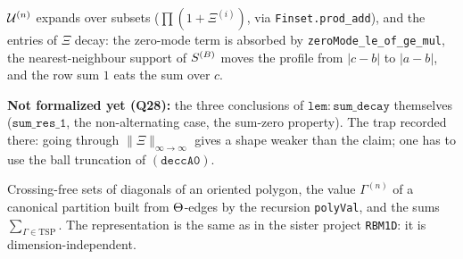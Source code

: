 \begin{lemma}\label{lem:sumdecay-parts}
  \leanok
  $\mathcal{U}^{(n)}$ expands over subsets ($\prod(1+\Xi^{(i)})$, via \texttt{Finset.prod\_add}), and
  the entries of $\Xi$ decay: the zero-mode term is absorbed by
  \texttt{zeroMode\_le\_of\_ge\_mul}, the nearest-neighbour support of $S^{(B)}$ moves the profile
  from $|c-b|$ to $|a-b|$, and the row sum $1$ eats the sum over $c$.

  \textbf{Not formalized yet (Q28):} the three conclusions of $\mathtt{lem{:}sum\_decay}$
  themselves ($\mathtt{sum\_res\_1}$, the non-alternating case, the sum-zero property).
  The trap recorded there: going through $\|\Xi\|_{\infty\to\infty}$ gives a shape weaker
  than the claim; one has to use the ball truncation of $\mathtt{(deccA0)}$.
\end{lemma}


\begin{definition}\label{def:tsp}
  \leanok
  Crossing-free sets of diagonals of an oriented polygon, the value $\Gamma^{(n)}$ of a
  canonical partition built from $\Theta$-edges by the recursion \texttt{polyVal}, and the
  sums $\sum_{\Gamma\in\mathrm{TSP}}$.  The representation is the same as in the sister
  project \texttt{RBM1D}: it is dimension-independent.
\end{definition}

